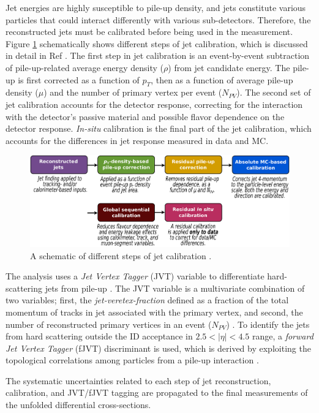 Jet energies are highly susceptible to pile-up density, and jets constitute various particles that could interact differently with various sub-detectors. Therefore, the reconstructed jets must be calibrated before being used in the measurement. Figure \ref{fig:JetCalib} schematically shows different steps of jet calibration, which is discussed in detail in Ref \cite{JetCalib}. The first step in jet calibration is an event-by-event subtraction of pile-up-related average energy density ($\rho$) from jet candidate energy. The pile-up is first corrected as a function of $p_{T}$, then as a function of average pile-up density ($\mu$) and the number of primary vertex per event ($N_{PV}$). The second set of jet calibration accounts for the detector response, correcting for the interaction with the detector's passive material and possible flavor dependence on the detector response. \textit{In-situ} calibration is the final part of the jet calibration, which accounts for the differences in jet response measured in data and MC. 

\begin{figure}[!htb]
    \centering
    \includegraphics[width=.95\linewidth]{figures/LHC/JetCalib.pdf}
    \caption{ A schematic of different steps of jet calibration \cite{JetCalib}.\label{fig:JetCalib}}
\end{figure}

The analysis uses a \textit{Jet Vertex Tagger} (JVT) variable to differentiate hard-scattering jets from pile-up \cite{JVT}. The JVT variable is a multivariate combination of two variables; first, the \textit{jet-veretex-fraction} defined as a fraction of the total momentum of tracks in jet associated with the primary vertex, and second, the number of reconstructed primary vertices in an event ($N_{PV}$) \cite{JVT}. To identify the jets from hard scattering outside the ID acceptance in $2.5<|\eta|<4.5$ range, a \textit{forward Jet Vertex Tagger} (fJVT) discriminant is used, which is derived by exploiting the topological correlations among particles from a pile-up interaction \cite{fJVT}. 

The systematic uncertainties related to each step of jet reconstruction, calibration, and JVT/fJVT tagging are propagated to the final measurements of the unfolded differential cross-sections.  

